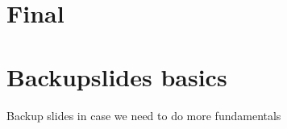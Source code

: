 \documentclass[compress]{beamer}
\begin{document}
\section{Final}




\section{Backupslides basics}

\begin{frame}[plain]
\centering
\huge
Backup slides in case we need to do more fundamentals
\end{frame}



\end{document}
